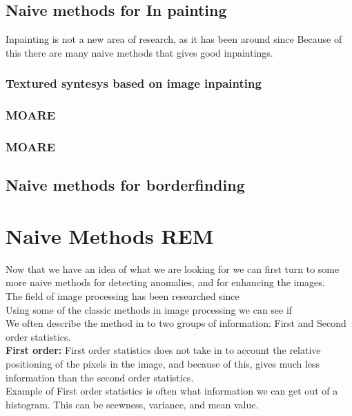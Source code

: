   \subsection{Naive methods for In painting}
    Inpainting is not a new area of research, as it has been around since %
    Because of this there are many naive methods that gives good inpaintings. 
	
    \subsubsection{Textured syntesys based on image inpainting}
    \subsubsection{MOARE}
    \subsubsection{MOARE}
   \subsection{Naive methods for borderfinding}

%
%
\section{Naive Methods REM}
	  Now that we have an idea of what we are looking for we can first turn to some more naive methods for detecting anomalies, and for enhancing the images.\\
	  The field of image processing has been researched since\\ %
	  
	  Using some of the classic methods in image processing we can see if\\ %
	  
	  We often describe the method in to two groups of information: First and Second order statistics.\\
	  \textbf{First order:} First order statistics does not take in to account the relative positioning of the pixels in the image, and because of this, gives much less
	  information than the second order statistics.\\
	  Example of First order statistics is often what information we can get out of a histogram. This can be scewness, variance, and mean value.\\
	  
